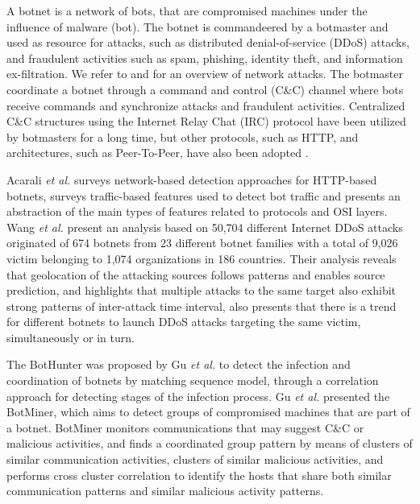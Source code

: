 \documentclass[review]{elsarticle}
\begin{document}
A botnet is a network of bots, that are compromised machines under the influence of malware (bot). The botnet is commandeered by a botmaster and used as resource for attacks, such as distributed denial-of-service (DDoS) attacks, and fraudulent activities such as spam, phishing, identity theft, and information ex-filtration. We refer to \cite{ahmed2016survey} and \cite{moustafa2019holistic} for an overview of network attacks. The botmaster coordinate a botnet through a command and control (C\&C) channel where bots receive commands and synchronize attacks and fraudulent activities. Centralized C\&C structures using the Internet Relay Chat (IRC) protocol have been utilized by botmasters for a long time, but other protocols, such as HTTP, and architectures, such as Peer-To-Peer, have also been adopted \cite{gu2008botminer}.

Acarali \emph{et al.} \cite{acarali2016survey} surveys network-based detection approaches for HTTP-based botnets, surveys traffic-based features used to detect bot traffic and presents an abstraction of the main types of features related to protocols and OSI layers. Wang \emph{et al.} \cite{Wang2018ddosbotnetssurvey} present an analysis based on 50,704 different Internet DDoS attacks originated of 674 botnets from 23 different botnet families with a total of 9,026 victim belonging to 1,074 organizations in 186 countries. Their analysis reveals that geolocation of the attacking sources follows patterns and enables source prediction, and highlights that multiple attacks to the same target also exhibit strong patterns of inter-attack time interval, also presents that there is a trend for different botnets to launch DDoS attacks targeting the same victim, simultaneously or in turn.

The BotHunter was proposed by Gu \emph{et al.} \cite{gu2007bothunter} to detect the infection and coordination of botnets by matching sequence model, through a correlation approach for detecting stages of the infection process.  Gu \emph{et al.} \cite{gu2008botminer} presented the BotMiner, which aims to detect groups of compromised machines that are part of a botnet. BotMiner monitors communications that may suggest C\&C or malicious activities, and finds a coordinated group pattern by means of clusters of similar communication activities, clusters of similar malicious activities, and performs cross cluster correlation to identify the hosts that share both similar communication patterns and similar malicious activity patterns.
\end{document}
